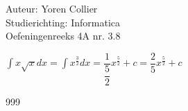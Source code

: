 \documentclass[a4paper]{article}
\newcommand{\intgrl}{\displaystyle\int} %
\begin{document}
\noindent \large Auteur: Yoren Collier \\
\noindent \large Studierichting: Informatica\\
\noindent \large Oefeningenreeks 4A nr. 3.8\\

\medskip

\normalsize

$ \intgrl x\sqrt{x} dx = \intgrl x^{\tfrac{3}{2}} dx = \dfrac{1}{\dfrac{5}{2}} x^{\tfrac{5}{2}} +c = \dfrac{2}{5}x^{\tfrac{5}{2}} +c$\\

\begin{thebibliography}{999}
\end{thebibliography}
\end{document}
